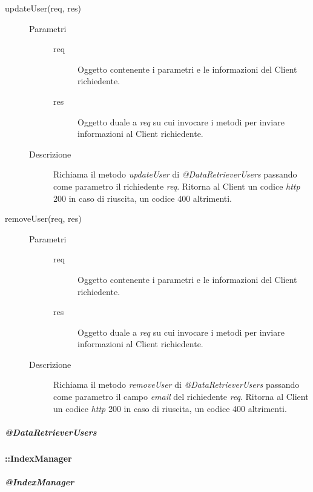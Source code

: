 \begin{description}
\begin{description}
    \item[updateUser(req, res)] \hfill
    \begin{description}
	\item[Parametri] \hfill
	  \begin{description}
	    \item[req]
	    Oggetto contenente i parametri e le informazioni del Client richiedente.
	    \item[res]
	    Oggetto duale a \textit{req} su cui invocare i metodi per inviare informazioni al Client richiedente.
	  \end{description}
	\item[Descrizione]
	Richiama il metodo \textit{updateUser} di \textit{@DataRetrieverUsers} passando come parametro 
	il richiedente \textit{req}. Ritorna al Client un codice \textit{http} 200 in caso di riuscita, 
	un codice 400 altrimenti.
      \end{description}
      
    \item[removeUser(req, res)] \hfill
    \begin{description}
	\item[Parametri] \hfill
	  \begin{description}
	    \item[req]
	    Oggetto contenente i parametri e le informazioni del Client richiedente.
	    \item[res]
	    Oggetto duale a \textit{req} su cui invocare i metodi per inviare informazioni al Client richiedente.
	  \end{description}
	\item[Descrizione]
	Richiama il metodo \textit{removeUser} di \textit{@DataRetrieverUsers} passando come parametro 
	il campo \textit{email} del richiedente \textit{req}. Ritorna al Client un codice \textit{http} 200 in caso di 
	riuscita, un codice 400 altrimenti.
      \end{description}
      
 \end{description}
 
\end{description}


\subparagraph{@DataRetrieverUsers}

\paragraph{::IndexManager}
\subparagraph{@IndexManager}

